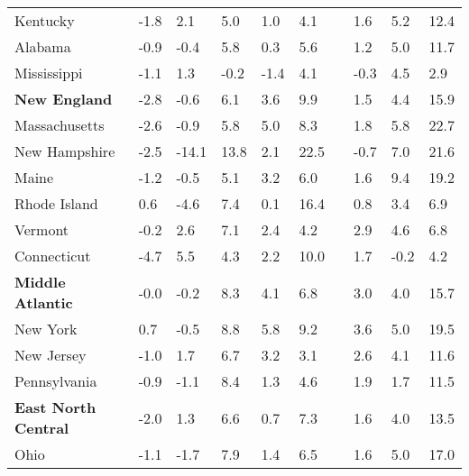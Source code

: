 {\begin{tabular}{p{30mm} R{7mm} R{7mm} R{7mm} R{7mm} 
             R{7mm} p{0mm} R{9mm} R{9mm} R{10mm} }
\hspace{3mm}  Kentucky  & -1.8 & 2.1 & 5.0 & 1.0 & 4.1 &  & 1.6 & 5.2 & 12.4 \\
\hspace{3mm}  Alabama  & -0.9 & -0.4 & 5.8 & 0.3 & 5.6 &  & 1.2 & 5.0 & 11.7 \\
\hspace{3mm}  Mississippi  & -1.1 & 1.3 & -0.2 & -1.4 & 4.1 &  & -0.3 & 4.5 & 2.9 \\
\hspace{1mm} \textbf{New England}  & -2.8 & -0.6 & 6.1 & 3.6 & 9.9 &  & 1.5 & 4.4 & 15.9 \\
\hspace{3mm}  Massachusetts  & -2.6 & -0.9 & 5.8 & 5.0 & 8.3 &  & 1.8 & 5.8 & 22.7 \\
\hspace{3mm}  New Hampshire  & -2.5 & -14.1 & 13.8 & 2.1 & 22.5 &  & -0.7 & 7.0 & 21.6 \\
\hspace{3mm}  Maine  & -1.2 & -0.5 & 5.1 & 3.2 & 6.0 &  & 1.6 & 9.4 & 19.2 \\
\hspace{3mm}  Rhode Island  & 0.6 & -4.6 & 7.4 & 0.1 & 16.4 &  & 0.8 & 3.4 & 6.9 \\
\hspace{3mm}  Vermont  & -0.2 & 2.6 & 7.1 & 2.4 & 4.2 &  & 2.9 & 4.6 & 6.8 \\
\hspace{3mm}  Connecticut  & -4.7 & 5.5 & 4.3 & 2.2 & 10.0 &  & 1.7 & -0.2 & 4.2 \\
\hspace{1mm} \textbf{Middle Atlantic}  & -0.0 & -0.2 & 8.3 & 4.1 & 6.8 &  & 3.0 & 4.0 & 15.7 \\
\hspace{3mm}  New York  & 0.7 & -0.5 & 8.8 & 5.8 & 9.2 &  & 3.6 & 5.0 & 19.5 \\
\hspace{3mm}  New Jersey  & -1.0 & 1.7 & 6.7 & 3.2 & 3.1 &  & 2.6 & 4.1 & 11.6 \\
\hspace{3mm}  Pennsylvania  & -0.9 & -1.1 & 8.4 & 1.3 & 4.6 &  & 1.9 & 1.7 & 11.5 \\
\hspace{1mm} \textbf{East North Central}  & -2.0 & 1.3 & 6.6 & 0.7 & 7.3 &  & 1.6 & 4.0 & 13.5 \\
\hspace{3mm}  Ohio  & -1.1 & -1.7 & 7.9 & 1.4 & 6.5 &  & 1.6 & 5.0 & 17.0 \\

\end{tabular}}
